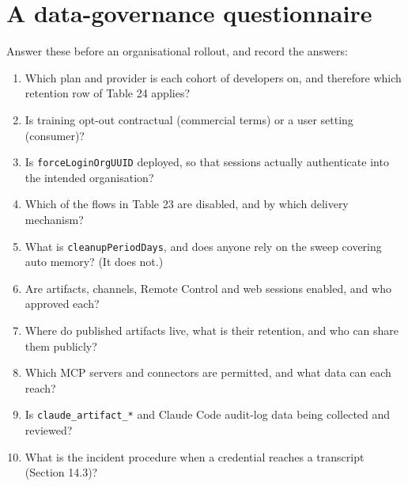 \documentclass[11pt,a4paper,twoside,openany]{book}
\begin{document}
\FloatBarrier
\setcounter{section}{4}
\section{A data-governance questionnaire}

Answer these before an organisational rollout, and record the answers:


\begin{enumerate}
\item Which plan and provider is each cohort of developers on, and therefore which retention row of Table 24 applies?
\item Is training opt-out contractual (commercial terms) or a user setting (consumer)?
\item Is \texttt{force\allowbreak{}Login\allowbreak{}Org\allowbreak{}UUID} deployed, so that sessions actually authenticate into the intended organisation?
\item Which of the flows in Table 23 are disabled, and by which delivery mechanism?
\item What is \texttt{cleanup\allowbreak{}Period\allowbreak{}Days}, and does anyone rely on the sweep covering auto memory? (It does not.)
\item Are artifacts, channels, Remote Control and web sessions enabled, and who approved each?
\item Where do published artifacts live, what is their retention, and who can share them publicly?
\item Which MCP servers and connectors are permitted, and what data can each reach?
\item Is \texttt{claude\_\allowbreak{}artifact\_\allowbreak{}*} and Claude Code audit-log data being collected and reviewed?
\item What is the incident procedure when a credential reaches a transcript (Section 14.3)?
\end{enumerate}
\end{document}
